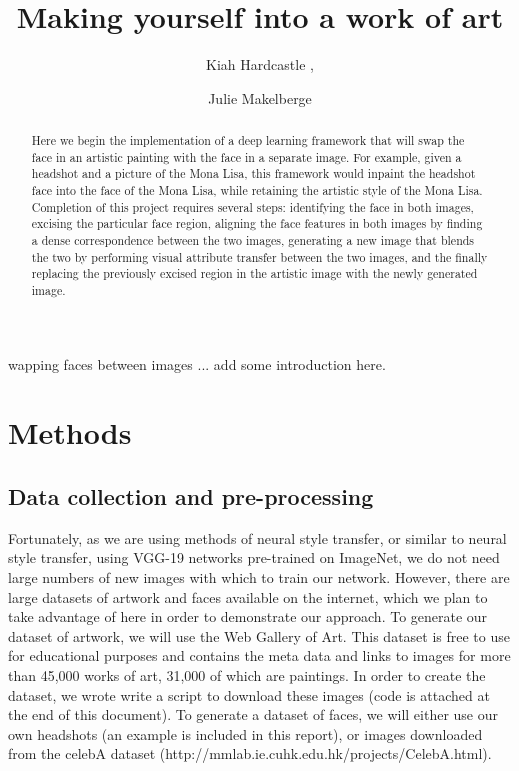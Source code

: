 \documentclass{pnastwo2}
\begin{document}
\title{Making yourself into a work of art}

\author{Kiah Hardcastle ,
\and Julie Makelberge}


\maketitle

\begin{article}

\begin{abstract}

Here we begin the implementation of a deep learning framework that will swap the face in an artistic painting with the face in a separate image. For example, given a headshot and a picture of the Mona Lisa, this framework would inpaint the headshot face into the face of the Mona Lisa, while retaining the artistic style of the Mona Lisa. Completion of this project requires several steps: identifying the face in both images, excising the particular face region, aligning the face features in both images by finding a dense correspondence between the two images, generating a new image that blends the two by performing visual attribute transfer between the two images, and the finally replacing the previously excised region in the artistic image with the newly generated image.

\end{abstract}

wapping faces between images ... add some introduction here.

\section{Methods}
\subsection{Data collection and pre-processing}

Fortunately, as we are using methods of neural style transfer, or similar to neural style transfer, using VGG-19 networks pre-trained on ImageNet, we do not need large numbers of new images with which to train our network. However, there are large datasets of artwork and faces available on the internet, which we plan to take advantage of here in order to demonstrate our approach. To generate our dataset of artwork, we will use the Web Gallery of Art. This dataset is free to use for educational purposes and contains the meta data and links to images for more than 45,000 works of art, 31,000 of which are paintings. In order to create the dataset, we wrote write a script to download these images (code is attached at the end of this document). To generate a dataset of faces, we will either use our own headshots (an example is included in this report), or images downloaded from the celebA dataset (http://mmlab.ie.cuhk.edu.hk/projects/CelebA.html). 



\end{article}
\end{document}

